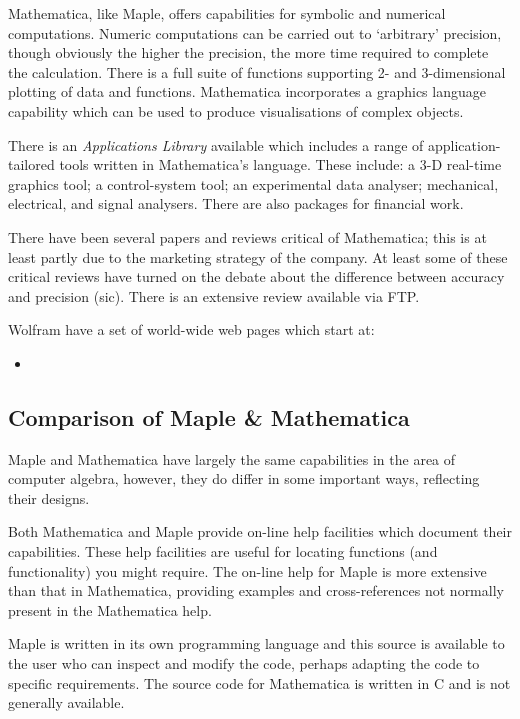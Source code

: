Mathematica, like Maple, offers capabilities for symbolic and numerical
computations.  Numeric computations can be carried out to `arbitrary'
precision, though obviously the higher the precision, the more time required
to complete the calculation.  There is a full suite of functions supporting
2- and 3-dimensional plotting of data and functions.  Mathematica
incorporates a graphics language capability which can be used to produce
visualisations of complex objects.

There is an {\sl Applications Library} available which includes a range of
application-tailored tools written in Mathematica's language.  These include:
a 3-D real-time graphics tool; a control-system tool; an experimental data
analyser; mechanical, electrical, and signal analysers.  There are also
packages for financial work.

There have been several papers and reviews critical of Mathematica; this
is at least partly due to the marketing strategy of the company.  At least
some of these critical reviews have turned on the debate about the difference
between accuracy and precision (sic).  There is an extensive
review available via FTP\cite{fateman}\@.

Wolfram have a set of world-wide web pages which start at:

\begin{itemize}

\item {}

\end{itemize}


\subsection{Comparison of Maple \& Mathematica}

Maple and Mathematica have largely the same capabilities in the area
of computer algebra, however, they do differ in some important ways,
reflecting their designs.

Both Mathematica and Maple provide on-line help facilities which document
their capabilities.  These help facilities are useful for locating
functions (and functionality) you might require.  The on-line help for
Maple is more extensive than that in Mathematica, providing examples and
cross-references not normally present in the Mathematica help.

Maple is written in its own programming language and this source is
available to the user who can inspect and modify the code, perhaps
adapting the code to specific requirements.  The source code for
Mathematica is written in C and is not generally available.

